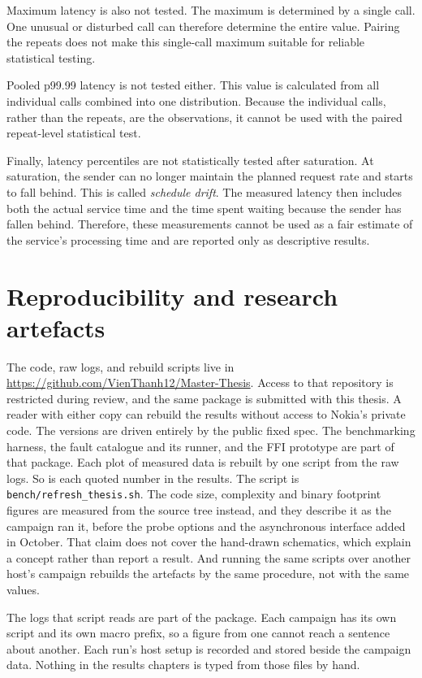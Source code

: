 \documentclass[english,oneside,a4paper,censored,csm,software-track-2020]{HYthesisML}
\begin{document}
Maximum latency is also not tested. The maximum is determined by a single call. One
unusual or disturbed call can therefore determine the entire value. Pairing the
repeats does not make this single-call maximum suitable for reliable statistical
testing.

Pooled p99.99 latency is not tested either. This value is calculated from all
individual calls combined into one distribution. Because the individual calls,
rather than the repeats, are the observations, it cannot be used with the paired
repeat-level statistical test.

Finally, latency percentiles are not statistically tested after saturation. At
saturation, the sender can no longer maintain the planned request rate and starts
to fall behind. This is called \emph{schedule drift}. The measured latency then
includes both the actual service time and the time spent waiting because the sender
has fallen behind. Therefore, these measurements cannot be used as a fair estimate
of the service's processing time and are reported only as descriptive results.

\section{Reproducibility and research artefacts}\label{sec:repro}
The code, raw logs, and rebuild scripts live in
\url{https://github.com/VienThanh12/Master-Thesis}. Access to that repository is
restricted during review, and the same package is submitted with this thesis.
A reader with either copy can rebuild the results without access to Nokia's
private code. The versions are driven entirely by the public fixed spec. The
benchmarking harness, the fault catalogue and its runner, and the FFI
prototype are part of that package. Each plot of measured data is rebuilt by
one script from the raw logs. So is each quoted number in the results. The
script is \texttt{bench/refresh\_thesis.sh}. The code size, complexity and binary
footprint figures are measured from the source tree instead, and they describe it as
the campaign ran it, before the probe options and the asynchronous interface added in
October. That claim does not cover the
hand-drawn schematics, which explain a concept rather than report a result.
And running the same scripts over another host's campaign rebuilds the
artefacts by the same procedure, not with the same values.

The logs that script reads are part of the package. Each campaign has its own
script and its own macro prefix, so a figure from one cannot reach a sentence
about another. Each run's host setup is recorded and stored beside the
campaign data. Nothing in the results chapters is typed from those files by
hand.
\end{document}
